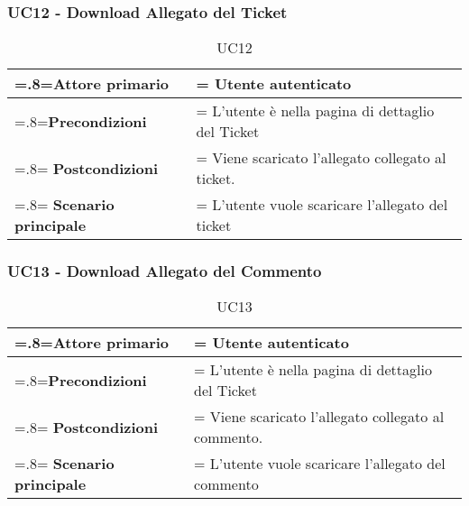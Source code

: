  \subsubsection{UC12 - Download Allegato del Ticket}
 \begin{table}[H]
                \centering
                \renewcommand{\arraystretch}{1.8}
                \renewcommand\tabularxcolumn[1]{m{#1}}
                \begin{tabularx}{0.9\textwidth} {
                    >{\hsize=.8\hsize\linewidth=\hsize}X
                    >{\hsize=1.2\hsize\linewidth=\hsize}X}
                    \hline
                    \textbf{Attore primario} & Utente autenticato \\
                    \hline
                    \textbf{Precondizioni} & L'utente è nella pagina di dettaglio del Ticket\\
                    \hline
                    \textbf{Postcondizioni} & Viene scaricato l'allegato collegato al ticket. \\
                    \hline
                    \textbf{Scenario principale} & L'utente vuole scaricare l'allegato del ticket \\
                    \hline
                   
                \end{tabularx}
                \caption{UC12}
            \end{table}  
            
\subsubsection{UC13 - Download Allegato del Commento}
     \begin{table}[H]
                \centering
                \renewcommand{\arraystretch}{1.8}
                \renewcommand\tabularxcolumn[1]{m{#1}}
                \begin{tabularx}{0.9\textwidth} {
                    >{\hsize=.8\hsize\linewidth=\hsize}X
                    >{\hsize=1.2\hsize\linewidth=\hsize}X}
                    \hline
                    \textbf{Attore primario} & Utente autenticato \\
                    \hline
                    \textbf{Precondizioni} & L'utente è nella pagina di dettaglio del Ticket\\
                    \hline
                    \textbf{Postcondizioni} & Viene scaricato l'allegato collegato al commento. \\
                    \hline
                    \textbf{Scenario principale} & L'utente vuole scaricare l'allegato del commento \\
                    \hline
                \end{tabularx}
                \caption{UC13}
            \end{table}      
                 
